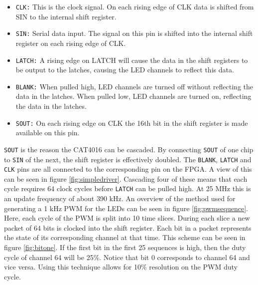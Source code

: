 \begin{itemize}
	\item \texttt{CLK:} This is the clock signal. On each rising edge of CLK data is shifted from SIN to the internal shift register.
	\item \texttt{SIN:} Serial data input. The signal on this pin is shifted into the internal shift register on each rising edge of CLK.
	\item \texttt{LATCH:} A rising edge on LATCH will cause the data in the shift registers to be output to the latches, causing the LED channels to reflect this data.
	\item \texttt{BLANK:} When pulled high, LED channels are turned off without reflecting the data in the latches. When pulled low, LED channels are turned on, reflecting the data in the latches.
	\item \texttt{SOUT:} On each rising edge on CLK the 16th bit in the shift register is made available on this pin.
\end{itemize}

\texttt{SOUT} is the reason the CAT4016 can be cascaded.
By connecting \texttt{SOUT} of one chip to \texttt{SIN} of the next, the shift register is effectively doubled.
The \texttt{BLANK}, \texttt{LATCH} and \texttt{CLK} pins are all connected to the corresponding pin on the FPGA.
A view of this can be seen in figure \ref{fig:simpledriver}.
Cascading four of these means that each cycle requires 64 clock cycles before \texttt{LATCH} can be pulled high.
At 25 MHz this is an update frequency of about 390 kHz.
An overview of the method used for generating a 1 kHz PWM for the LEDs can be seen in figure \ref{fig:pwmsequence}. 
Here, each cycle of the PWM is split into 10 time slices.
During each slice a new packet of 64 bits is clocked into the shift register.
Each bit in a packet represents the state of its corresponding channel at that time.
This scheme can be seen in figure \ref{fig:bitone}.
If the first bit in the first 25 sequences is high, then the duty cycle of channel 64 will be 25\%.
Notice that bit 0 corresponds to channel 64 and vice versa.
Using this technique allows for 10\% resolution on the PWM duty cycle.

